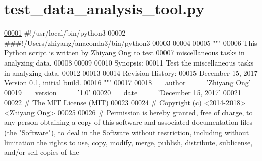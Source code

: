 \hypertarget{test__data__analysis__tool_8py_source}{}\section{test\+\_\+data\+\_\+analysis\+\_\+tool.\+py}
\label{test__data__analysis__tool_8py_source}

\begin{DoxyCode}
\hypertarget{test__data__analysis__tool_8py_source_l00001}{}\hyperlink{namespacestatistics_1_1test__data__analysis__tool}{00001} \textcolor{comment}{#!/usr/local/bin/python3}
00002 \textcolor{comment}{###!/Users/zhiyang/anaconda3/bin/python3}
00003 
00004 
00005 \textcolor{stringliteral}{"""}
00006 \textcolor{stringliteral}{    This Python script is written by Zhiyang Ong to test}
00007 \textcolor{stringliteral}{        miscellaneous tasks in analyzing data.}
00008 \textcolor{stringliteral}{}
00009 \textcolor{stringliteral}{}
00010 \textcolor{stringliteral}{    Synopsis:}
00011 \textcolor{stringliteral}{    Test the miscellaneous tasks in analyzing data.}
00012 \textcolor{stringliteral}{}
00013 \textcolor{stringliteral}{}
00014 \textcolor{stringliteral}{    Revision History:}
00015 \textcolor{stringliteral}{    December 15, 2017           Version 0.1, initial build.}
00016 \textcolor{stringliteral}{"""}
00017 
\hypertarget{test__data__analysis__tool_8py_source_l00018}{}\hyperlink{namespacestatistics_1_1test__data__analysis__tool_a980d8dc33d59285196b930ec7ddabdc8}{00018} \_\_author\_\_ = \textcolor{stringliteral}{'Zhiyang Ong'}
\hypertarget{test__data__analysis__tool_8py_source_l00019}{}\hyperlink{namespacestatistics_1_1test__data__analysis__tool_a3299e44231fc0bc029f4c6d86924b125}{00019} \_\_version\_\_ = \textcolor{stringliteral}{'1.0'}
\hypertarget{test__data__analysis__tool_8py_source_l00020}{}\hyperlink{namespacestatistics_1_1test__data__analysis__tool_a15ce2cfbc6ba4e95b94a79c18678373f}{00020} \_\_date\_\_ = \textcolor{stringliteral}{'December 15, 2017'}
00021 
00022 \textcolor{comment}{#   The MIT License (MIT)}
00023 
00024 \textcolor{comment}{#   Copyright (c) <2014-2018> <Zhiyang Ong>}
00025 
00026 \textcolor{comment}{#   Permission is hereby granted, free of charge, to any person obtaining a copy of this software and
       associated documentation files (the "Software"), to deal in the Software without restriction, including without
       limitation the rights to use, copy, modify, merge, publish, distribute, sublicense, and/or sell copies of the
}
\end{DoxyCode}
